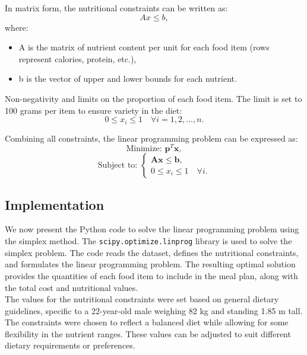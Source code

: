 \documentclass[10pt]{article}
\begin{document}
In matrix form, the nutritional constraints can be written as:
\[
Ax \leq b,
\]
where:
\begin{itemize}
    \item A is the matrix of nutrient content per unit for each food item (rows represent calories, protein, etc.),
    \item b is the vector of upper and lower bounds for each nutrient.
\end{itemize}

Non-negativity and limits on the proportion of each food item. The limit is set to 100 grams per item to ensure variety in the diet:
\[
0 \leq x_i \leq 1 \quad \forall i = 1, 2, \ldots, n.
\]

Combining all constraints, the linear programming problem can be expressed as:
\[
\text{Minimize: } \mathbf{p}^T \mathbf{x},
\]
\[
\text{Subject to: }
\begin{cases}
    \mathbf{A} \mathbf{x} \leq \mathbf{b}, \\
    0 \leq x_i \leq 1 \quad \forall i.
\end{cases}
\]


\subsection{Implementation}

We now present the Python code to solve the linear programming problem using the simplex method. The \texttt{scipy.optimize.linprog} library is used to solve the simplex problem. The code reads the dataset, defines the nutritional constraints, and formulates the linear programming problem. The resulting optimal solution provides the quantities of each food item to include in the meal plan, along with the total cost and nutritional values.\\

The values for the nutritional constraints were set based on general dietary guidelines, specific to a 22-year-old male weighing 82 kg and standing 1.85 m tall. The constraints were chosen to reflect a balanced diet while allowing for some flexibility in the nutrient ranges.
These values can be adjusted to suit different dietary requirements or preferences.\\
\end{document}
